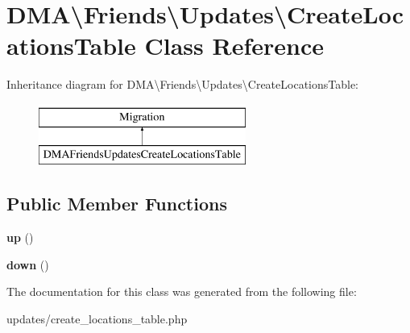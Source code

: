 \hypertarget{classDMA_1_1Friends_1_1Updates_1_1CreateLocationsTable}{\section{D\-M\-A\textbackslash{}Friends\textbackslash{}Updates\textbackslash{}Create\-Locations\-Table Class Reference}
\label{classDMA_1_1Friends_1_1Updates_1_1CreateLocationsTable}
}
Inheritance diagram for D\-M\-A\textbackslash{}Friends\textbackslash{}Updates\textbackslash{}Create\-Locations\-Table\-:\begin{figure}[H]
\begin{center}
\leavevmode
\includegraphics[height=2.000000cm]{d5/dd8/classDMA_1_1Friends_1_1Updates_1_1CreateLocationsTable}
\end{center}
\end{figure}
\subsection*{Public Member Functions}
\begin{DoxyCompactItemize}
\item 
\hypertarget{classDMA_1_1Friends_1_1Updates_1_1CreateLocationsTable_af5e0c4b15091d84e459c5f4df2c6d007}{{\bfseries up} ()}\label{classDMA_1_1Friends_1_1Updates_1_1CreateLocationsTable_af5e0c4b15091d84e459c5f4df2c6d007}

\item 
\hypertarget{classDMA_1_1Friends_1_1Updates_1_1CreateLocationsTable_a1203d01deede06c97234a493a2a99f34}{{\bfseries down} ()}\label{classDMA_1_1Friends_1_1Updates_1_1CreateLocationsTable_a1203d01deede06c97234a493a2a99f34}

\end{DoxyCompactItemize}


The documentation for this class was generated from the following file\-:\begin{DoxyCompactItemize}
\item 
updates/create\-\_\-locations\-\_\-table.\-php\end{DoxyCompactItemize}
